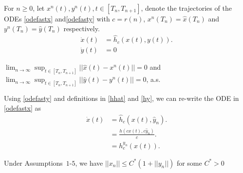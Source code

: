 For $n\geq0$, let $x^n(t), y^n(t), t\in [T_n,T_{n+1}]$, denote the trajectories of the ODEs \eqref{odefastx} and\eqref{odefasty} with $c=r(n)$, $x^n(T_n)=\hat{x}(T_n)$ and $y^n(T_n)=\hat{y}(T_n)$ respectively.
\begin{align}
\label{odefastx}\dot{x}(t)&=\hat{h}_{c}({x}(t),{y}(t)).\\
\label{odefasty}\dot{y}(t)&=0
\end{align}
\begin{lemma}
$\lim_{n\rightarrow \infty} \sup_{t\in[T_n,T_{n+1}]}||\hat{x}(t)-x^n(t)||=0$ and $\lim_{n\rightarrow \infty} \sup_{t\in[T_n,T_{n+1}]}||\hat{y}(t)-y^n(t)||=0$, a.s.
\end{lemma}
Using \eqref{odefasty} and definitions in \eqref{hhat} and \eqref{hy}, we can re-write the ODE in \eqref{odefastx} as
\begin{align}
\label{odehat}\dot{x}(t)&=\hat{h}_{c}({x}(t),\hat{y}_n).\\
			&=\frac{h(cx(t),c\hat{y}_n)}{c}.\\
			&=h^{y_n}_c(x(t)).
\end{align}
\begin{theorem}\label{maintheorem}
Under Assumptions~$1$-$5$, we have $||x_n||\leq C^*(1+||y_n||)$ for some $C^*>0$
\end{theorem}
